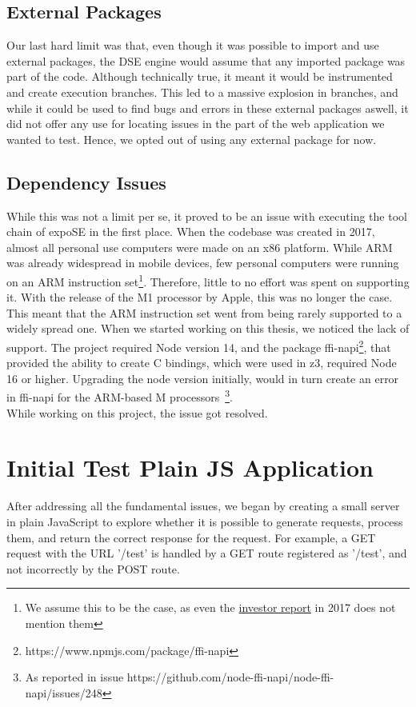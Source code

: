 \subsection{External Packages}
\label{sec:externalpack}
Our last hard limit was that, even though it was possible to import and use external packages, the DSE engine would assume that any imported package was part of the code. Although technically true, it meant it would be instrumented and create execution branches. This led to a massive explosion in branches, and while it could be used to find bugs and errors in these external packages aswell, it did not offer any use for locating issues in the part of the web application we wanted to test. 
Hence, we opted out of using any external package for now.

\subsection{Dependency Issues}
\label{sec:dep-issues}
While this was not a limit per se, it proved to be an issue with executing the tool chain of expoSE in the first place. When the codebase was created in 2017, almost all personal use computers were made on an x86 platform. While ARM was already widespread in mobile devices, few personal computers were running on an ARM instruction set\footnote{We assume this to be the case, as even the \href{https://www.arm.com/-/media/global/company/investors/Arm\%20Strategic\%20Review\%20-\%202017.pdf?revision=8473a535-6f7e-4ce5-85fe-0eb6f1f75487&la=en}{investor report} in 2017 does not mention them}. Therefore, little to no effort was spent on supporting it. 
With the release of the M1 processor by Apple, this was no longer the case.
This meant that the ARM instruction set went from being rarely supported to a widely spread one.
When we started working on this thesis, we noticed the lack of support. The project required Node version 14, and the package ffi-napi\footnote{https://www.npmjs.com/package/ffi-napi}, that provided the ability to create C bindings, which were used in z3, required Node 16 or higher.
Upgrading the node version initially, would in turn create an error in ffi-napi for the ARM-based M processors~\footnote{As reported in issue https://github.com/node-ffi-napi/node-ffi-napi/issues/248}.\\
While working on this project, the issue got resolved.



\section{Initial Test Plain JS Application}
\label{sec:init-test-plain}
After addressing all the fundamental issues, we began by creating a small server in plain JavaScript to explore whether it is possible to generate requests, process them, and return the correct response for the request. For example, a GET request with the URL '/test' is handled by a GET route registered as '/test', and not incorrectly by the POST route. 

